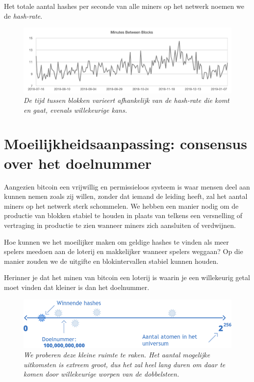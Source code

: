 Het totale aantal hashes per seconde van alle miners op het netwerk noemen we de \textit{hash-rate}.



\begin{figure}
    \centering
    \includegraphics[width=\textwidth]{images/fig7.png}
    \caption{\footnotesize{\textit{De tijd tussen blokken varieert afhankelijk van de hash-rate die komt en gaat, evenals willekeurige kans.}}}
    \label{fig7}
\end{figure}


\section{Moeilijkheidsaanpassing: consensus over het doelnummer}

Aangezien bitcoin een vrijwillig en permissieloos systeem is waar mensen deel aan kunnen nemen zoals zij willen, zonder dat iemand de leiding heeft, zal het aantal miners op het netwerk sterk schommelen. We hebben een manier nodig om de productie van blokken stabiel te houden in plaats van telkens een versnelling of vertraging in productie te zien wanneer miners zich aansluiten of verdwijnen.

Hoe kunnen we het moeilijker maken om geldige hashes te vinden als meer spelers meedoen aan de loterij en makkelijker wanneer spelers weggaan? Op die manier zouden we de uitgifte en blokintervallen stabiel kunnen houden.

Herinner je dat het minen van bitcoin een loterij is waarin je een willekeurig getal moet vinden dat kleiner is dan het doelnummer.


\begin{figure}
    \centering
    \includegraphics[width=\textwidth]{images/fig5.png}
    \caption{\footnotesize{\textit{We proberen deze kleine ruimte te raken. Het aantal mogelijke uitkomsten is extreem groot, dus het zal heel lang duren om daar te komen door willekeurige worpen van de dobbelsteen.}}}
    \label{fig8}
\end{figure}


